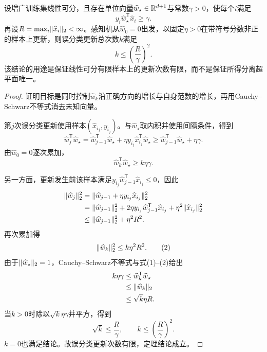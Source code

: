 \label{struct:V2-C01-CH12}
\begin{theorem}[Novikoff误分类上界]\label{thm:V2-C01-novikoff}
设增广训练集线性可分，且存在单位向量$\widehat w_\star\in\mathbb{R}^{d+1}$与常数$\gamma>0$，使每个$i$满足
\[
y_i\widehat w_\star^{\mathsf T}\widehat x_i\ge\gamma.
\]
再设$R=\max_i\lVert\widehat x_i\rVert_2<\infty$。感知机从$\widehat w_0=0$出发，以固定$\eta>0$在带符号分数非正的样本上更新，则误分类更新总次数$k$满足
\[
k\le\left(\frac{R}{\gamma}\right)^2.
\]
该结论的用途是保证线性可分有限样本上的更新次数有限，而不是保证所得分离超平面唯一。
\end{theorem}

\label{struct:V2-C01-CH13}
\begin{proof}
证明目标是同时控制$\widehat w_k$沿正确方向的增长与自身范数的增长，再用Cauchy--Schwarz不等式消去未知向量。

第$j$次误分类更新使用样本$(\widehat x_{i_j},y_{i_j})$。与$\widehat w_\star$取内积并使用间隔条件，得到
\[
\widehat w_j^{\mathsf T}\widehat w_\star
=\widehat w_{j-1}^{\mathsf T}\widehat w_\star
+\eta y_{i_j}\widehat x_{i_j}^{\mathsf T}\widehat w_\star
\ge \widehat w_{j-1}^{\mathsf T}\widehat w_\star+\eta\gamma.
\]
由$\widehat w_0=0$逐次累加，
\[
\widehat w_k^{\mathsf T}\widehat w_\star\ge k\eta\gamma. \tag{1}
\]

另一方面，更新发生前该样本满足$y_{i_j}\widehat w_{j-1}^{\mathsf T}\widehat x_{i_j}\le0$，因此
\begin{align*}
\lVert\widehat w_j\rVert_2^2
&=\lVert\widehat w_{j-1}+\eta y_{i_j}\widehat x_{i_j}\rVert_2^2\\
&=\lVert\widehat w_{j-1}\rVert_2^2
+2\eta y_{i_j}\widehat w_{j-1}^{\mathsf T}\widehat x_{i_j}
+\eta^2\lVert\widehat x_{i_j}\rVert_2^2\\
&\le\lVert\widehat w_{j-1}\rVert_2^2+\eta^2R^2.
\end{align*}
再次累加得
\[
\lVert\widehat w_k\rVert_2^2\le k\eta^2R^2. \tag{2}
\]
由于$\lVert\widehat w_\star\rVert_2=1$，Cauchy--Schwarz不等式与式(1)--(2)给出
\[
\begin{aligned}
k\eta\gamma
&\le\widehat w_k^{\mathsf T}\widehat w_\star\\
&\le\lVert\widehat w_k\rVert_2\\
&\le\sqrt{k}\eta R.
\end{aligned}
\]
当$k>0$时除以$\sqrt{k}\eta\gamma$并平方，得到
\[
\sqrt{k}\le \frac{R}{\gamma},
\qquad
k\le\left(\frac{R}{\gamma}\right)^2.
\]
$k=0$也满足结论。故误分类更新次数有限，定理结论成立。
\end{proof}



